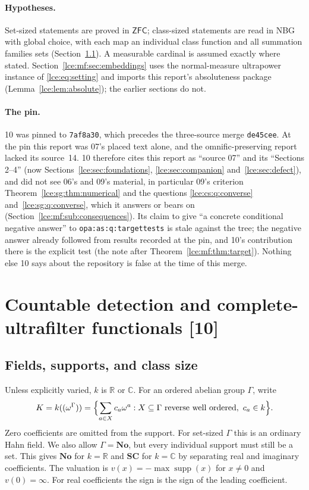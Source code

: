 \documentclass[11pt,letterpaper]{article}
\numberwithin{equation}{section}
\theoremstyle{definition}
\theoremstyle{remark}
\newcommand{\No}{\mathbf{No}}
\newcommand{\SC}{\mathbf{SC}}
\newcommand{\R}{\mathbb R}
\newcommand{\C}{\mathbb C}
\newcommand{\supp}{\operatorname{supp}}
\newcommand{\ZFC}{\mathsf{ZFC}}
\newcommand{\thref}[1]{Theorem~\ref{#1}}
\newcommand{\leref}[1]{Lemma~\ref{#1}}
\newcommand{\src}[1]{\textup{\textsf{\small[#1]}}}%
\newcommand{\lbl}[1]{\nolinkurl{#1}}%
\newcommand{\HF}[2]{#1((\omega^{#2}))}
\begin{document}
\paragraph{Hypotheses.} Set-sized statements are proved in $\ZFC$;
class-sized statements are read in NBG with global choice, with each map an
individual class function and all summation families sets
(Section~\ref{lce:mf:sub:foundations}). A measurable cardinal is assumed
exactly where stated. Section~\ref{lce:mf:sec:embeddings} uses the
normal-measure ultrapower instance of \eqref{lce:eq:setting} and imports
this report's absoluteness package (\leref{lce:lem:absolute}); the earlier
sections do not.

\paragraph{The pin.} 10 was pinned to \texttt{7af8a30}, which precedes the
three-source merge \texttt{de45cee}. At the pin this report was 07's placed
text alone, and the omnific-preserving report lacked its source~14. 10
therefore cites this report as ``source 07'' and its ``Sections 2--4''
(now Sections~\ref{lce:sec:foundations}, \ref{lce:sec:companion}
and~\ref{lce:sec:defect}), and did not see 06's and 09's material, in
particular 09's criterion \thref{lce:sg:thm:numerical} and the questions
\ref{lce:cs:q:converse} and~\ref{lce:sg:q:converse}, which it answers or
bears on (Section~\ref{lce:mf:sub:consequences}). Its claim to give ``a
concrete conditional negative answer'' to \lbl{opa:as:q:targettests} is
stale against the tree; the negative answer already followed from results
recorded at the pin, and 10's contribution there is the explicit test
(the note after \thref{lce:mf:thm:target}). Nothing else 10 says about the
repository is false at the time of this merge.

\section{Countable detection and complete-ultrafilter functionals \src{10}}
\label{lce:mf:sec:detect}

\subsection{Fields, supports, and class size}\label{lce:mf:sub:foundations}
Unless explicitly varied, $k$ is $\R$ or $\C$. For an ordered abelian group
$\Gamma$, write
\[
 K=\HF k\Gamma=\Bigl\{\sum_{a\in X}c_a\omega^a:
 X\subseteq\Gamma\text{ reverse well ordered},\ c_a\in k\Bigr\}.
\]
Zero coefficients are omitted from the support. For set-sized $\Gamma$ this
is an ordinary Hahn field. We also allow $\Gamma=\No$, but every individual
support must still be a set. This gives $\No$ for $k=\R$ and $\SC$ for
$k=\C$ by separating real and imaginary coefficients. The valuation is
$v(x)=-\max\supp(x)$ for $x\ne0$ and $v(0)=\infty$. For real coefficients
the sign is the sign of the leading coefficient.
\end{document}
